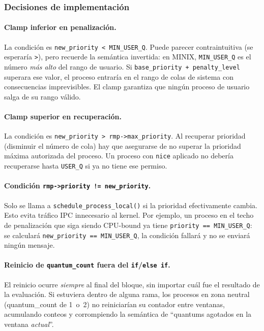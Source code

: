 \documentclass[11pt,a4paper]{article}
\begin{document}
\subsubsection*{Decisiones de implementaci\'on}

\paragraph{Clamp inferior en penalizaci\'on.}
La condici\'on es \verb|new_priority < MIN_USER_Q|. Puede parecer contraintuitiva
(se esperar\'ia \texttt{>}), pero recuerde la sem\'antica invertida: en MINIX,
\texttt{MIN\_USER\_Q} es el n\'umero \emph{m\'as alto} del rango de usuario.
Si \texttt{base\_priority + penalty\_level} superara ese valor, el proceso entrar\'ia
en el rango de colas de sistema con consecuencias imprevisibles. El clamp garantiza
que ning\'un proceso de usuario salga de su rango v\'alido.

\paragraph{Clamp superior en recuperaci\'on.}
La condici\'on es \verb|new_priority > rmp->max_priority|. Al recuperar prioridad
(disminuir el n\'umero de cola) hay que asegurarse de no superar la prioridad m\'axima
autorizada del proceso. Un proceso con \texttt{nice} aplicado no deber\'ia recuperarse
hasta \texttt{USER\_Q} si ya no tiene ese permiso.

\paragraph{Condici\'on \texttt{rmp->priority != new\_priority}.}
Solo se llama a \texttt{schedule\_process\_local()} si la prioridad efectivamente cambia.
Esto evita tr\'afico IPC innecesario al kernel. Por ejemplo, un proceso en el techo de
penalizaci\'on que siga siendo CPU-bound ya tiene \texttt{priority == MIN\_USER\_Q}:
se calcular\'a \texttt{new\_priority == MIN\_USER\_Q}, la condici\'on fallar\'a y no
se enviar\'a ning\'un mensaje.

\paragraph{Reinicio de \texttt{quantum\_count} fuera del \texttt{if}/\texttt{else if}.}
El reinicio ocurre \emph{siempre} al final del bloque, sin importar cu\'al fue el
resultado de la evaluaci\'on. Si estuviera dentro de alguna rama, los procesos en zona
neutral (quantum\_count de 1~o~2) no reiniciar\'ian su contador entre ventanas,
acumulando conteos y corrompiendo la sem\'antica de ``quantums agotados en la ventana
\emph{actual}''.
\end{document}

